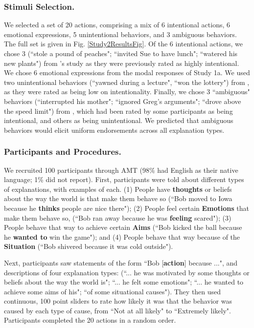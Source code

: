 \documentclass[10pt,letterpaper]{article}
\newcommand{\ndg}[1]{\textcolor{Green}{[ndg: #1]}}
\begin{document}
\subsubsection{Stimuli Selection.} We selected a set of 20 actions, comprising a mix of 6 intentional actions, 6 emotional expressions, 5 unintentional behaviors, and 3 ambiguous behaviors. The full set is given in Fig. \ref{Study2ResultsFig}. Of the 6 intentional actions, we chose 3 (``stole a pound of peaches"; ``invited Sue to have lunch"; ``watered his new plants") from 's study as they were previously rated as  highly intentional.%
We chose 6 emotional expressions from the modal responses of Study 1a. We used two unintentional behaviors (``yawned during a lecture", ``won the lottery") from , as they were rated as being low on intentionality.
Finally, we chose 3 ``ambiguous" behaviors (``interrupted his mother"; ``ignored Greg's arguments"; ``drove above the speed limit") from , which had been rated by some participants as being intentional, and others as being unintentional.
We predicted that ambiguous behaviors would elicit uniform endorsements across all explanation types.

\subsubsection{Participants and Procedures.} 
We recruited 100 participants through AMT (98\% had English as their native language; 1\% did not report).
First, participants were told about different types of explanations, with examples of each. (1) People have \textbf{thoughts} or beliefs about the way the world is that make them behave so (``Bob moved to Iowa because he \textbf{thinks} people are nice there"); 
(2) People feel certain \textbf{Emotions} that make them behave so, (``Bob ran away because he was \textbf{feeling} scared"); 
(3) People behave that way to achieve certain \textbf{Aims} (``Bob kicked the ball because he \textbf{wanted to} win the game"); and 
(4) People behave that way because of the \textbf{Situation} (``Bob shivered because it was cold outside").

Next, participants saw statements of the form ``Bob [\textbf{action}] because ...", and descriptions of four explanation types: (``... he was motivated by some thoughts or beliefs about the way the world is"; ``... he felt some emotions"; ``... he wanted to achieve some aims of his"; ``of some situational causes"). They then used continuous, 100 point sliders to rate how likely it was that the behavior was caused by each type of cause, from ``Not at all likely" to ``Extremely likely". Participants completed the 20 actions in a random order.
\end{document}
